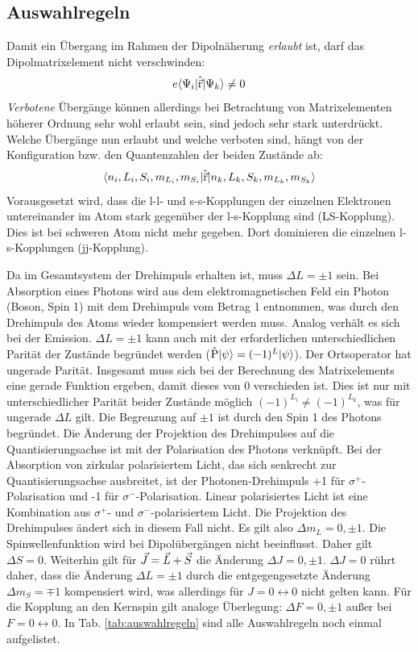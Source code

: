 \subsection{Auswahlregeln}\label{subsec:auswahlregeln}
Damit ein Übergang im Rahmen der Dipolnäherung \textit{erlaubt} ist, darf das
Dipolmatrixelement nicht verschwinden:
\begin{equation}\label{eq:dipolmatrixelement}
	e\langle{\Psi_i}|\hat{\vec{\mathrm{r}}}|{\Psi_k}\rangle\neq0
\end{equation}
\textit{Verbotene} Übergänge können allerdings bei Betrachtung von
Matrixelementen höherer Ordnung sehr wohl erlaubt sein, sind jedoch sehr stark
unterdrückt. Welche Übergänge nun erlaubt und welche verboten sind, hängt von
der Konfiguration bzw. den Quantenzahlen der beiden Zustände ab:
\begin{equation}\label{eq:dipolmatrixelement_quantenzahlen}
	\langle{n_i,L_i,S_i,m_{L_i}, m_{S_i}}|\hat{\vec{\mathrm{r}}}|{n_k,L_k,S_k,m_{L_k}, m_{S_k}}\rangle
\end{equation}
Vorausgesetzt wird, dass die l-l- und s-s-Kopplungen der einzelnen Elektronen
untereinander im Atom stark gegenüber der l-s-Kopplung sind (LS-Kopplung).
Dies ist bei schweren Atom nicht mehr gegeben. Dort dominieren die einzelnen
l-s-Kopplungen (jj-Kopplung).\par
Da im Gesamtsystem der Drehimpuls erhalten ist, muss $\Delta L =\pm1$ sein.
Bei Absorption eines Photons wird aus dem elektromagnetischen Feld ein Photon (Boson, Spin 1) mit dem Drehimpuls vom
Betrag 1 entnommen, was durch den Drehimpuls des Atoms wieder kompensiert werden
muss. Analog verhält es sich bei der Emission. $\Delta L =\pm1$ kann auch mit
der erforderlichen unterschiedlichen Parität der Zustände begründet werden
($\hat{\mathrm{P}}|{\psi}\rangle=(-1)^L|{\psi}\rangle$). Der Ortsoperator hat ungerade Parität.
Insgesamt muss sich bei der Berechnung des Matrixelements eine gerade Funktion
ergeben, damit dieses von 0 verschieden ist. Dies ist nur mit unterschiedlicher
Parität beider Zustände möglich $(-1)^{L_i}\neq(-1)^{L_k}$, was für ungerade
$\Delta L$ gilt. Die Begrenzung auf $\pm1$ ist durch den Spin 1 des Photons
begründet. Die Änderung der Projektion des Drehimpulses auf die
Quantisierungsachse ist mit der Polarisation des Photons verknüpft. Bei der
Absorption von zirkular polarisiertem Licht, das sich senkrecht zur
Quantisierungsachse ausbreitet, ist der Photonen-Drehimpuls +1 für
$\sigma^+$-Polarisation und -1 für $\sigma^-$-Polarisation. Linear polarisiertes
Licht ist eine Kombination aus $\sigma^+$- und $\sigma^-$-polarisiertem Licht.
Die Projektion des Drehimpulses ändert sich in diesem Fall nicht. Es gilt also
$\Delta m_L = 0, \pm1$. Die Spinwellenfunktion wird bei Dipolübergängen nicht
beeinflusst. Daher gilt $\Delta S=0$. Weiterhin gilt für $\vec{J}=\vec{L}+\vec{S}$ die
Änderung $\Delta J=0,\pm1$. $\Delta J=0$ rührt daher, dass die Änderung $\Delta
L=\pm1$ durch die entgegengesetzte Änderung $\Delta m_S=\mp1$ kompensiert wird,
was allerdings für $J=0\leftrightarrow0$ nicht gelten kann. Für die Kopplung an
den Kernspin gilt analoge Überlegung: $\Delta F = 0, \pm1$ außer bei
$F=0\leftrightarrow0$. In Tab. \ref{tab:auswahlregeln} sind alle
Auswahlregeln noch einmal aufgelistet.

